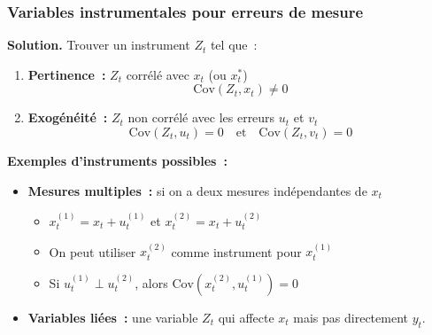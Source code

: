 \documentclass[10pt]{beamer}
\begin{document}
\begin{frame}
  \frametitle{Variables instrumentales pour erreurs de mesure}

  \textbf{Solution.} Trouver un instrument $Z_t$ tel que~:

  \begin{enumerate}
  \item \textbf{Pertinence~:} $Z_t$ corrélé avec $x_t$ (ou $x_t^*$)
    \[ \mathrm{Cov}\left(Z_t, x_t\right) \neq 0 \]
  \item \textbf{Exogénéité~:} $Z_t$ non corrélé avec les erreurs $u_t$ et $v_t$
    \[ \mathrm{Cov}\left(Z_t, u_t\right) = 0 \quad \text{et} \quad \mathrm{Cov}\left(Z_t, v_t\right) = 0 \]
  \end{enumerate}

  \medskip

  \textbf{Exemples d'instruments possibles~:}

  \begin{itemize}

  \item \textbf{Mesures multiples~:} si on a deux mesures indépendantes de $x_t$
    \begin{itemize}
    \item $x_t^{(1)} = x_t + u_t^{(1)}$ et $x_t^{(2)} = x_t + u_t^{(2)}$
    \item On peut utiliser $x_t^{(2)}$ comme instrument pour $x_t^{(1)}$
    \item Si $u_t^{(1)} \perp u_t^{(2)}$, alors
      $\mathrm{Cov}\left(x_t^{(2)}, u_t^{(1)}\right) = 0$
    \end{itemize}

  \item \textbf{Variables liées~:} une variable $Z_t$ qui affecte $x_t$ mais pas
    directement $y_t$.

  \end{itemize}

\end{frame}
\end{document}
